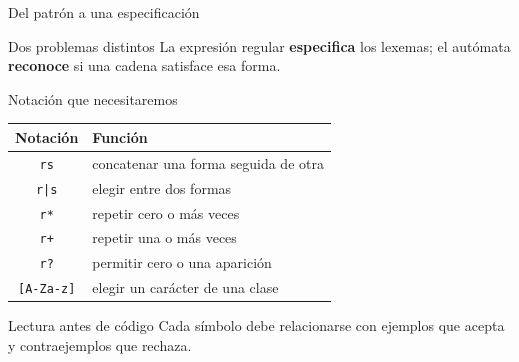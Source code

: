 \documentclass[11pt,spanish]{beamer}
\newcommand{\term}[1]{\textbf{\textcolor{indiagreen!80!black}{#1}}}
\begin{document}
\begin{frame}{Del patrón a una especificación}
\vfill

\begin{center}
\end{center}

\bigskip

\begin{block}{Dos problemas distintos}
La expresión regular \term{especifica} los lexemas; el autómata \term{reconoce} si una cadena satisface esa forma.
\end{block}

\vfill
\end{frame}

\begin{frame}{Notación que necesitaremos}
\vfill

\begin{center}
\small
\renewcommand{\arraystretch}{1.3}
\begin{tabular}{|c|L{.62\textwidth}|}
\hline
\textbf{Notación} & \textbf{Función} \\
\hline
\texttt{rs} & concatenar una forma seguida de otra \\
\hline
\texttt{r|s} & elegir entre dos formas \\
\hline
\texttt{r*} & repetir cero o más veces \\
\hline
\texttt{r+} & repetir una o más veces \\
\hline
\texttt{r?} & permitir cero o una aparición \\
\hline
\texttt{[A-Za-z]} & elegir un carácter de una clase \\
\hline
\end{tabular}
\end{center}

\bigskip

\begin{alertblock}{Lectura antes de código}
Cada símbolo debe relacionarse con ejemplos que acepta y contraejemplos que rechaza.
\end{alertblock}

\vfill
\end{frame}
\end{document}
